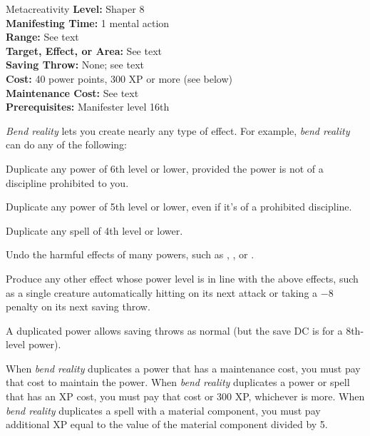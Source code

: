 {Metacreativity}
{
	\textbf{Level:}
	Shaper 8\\
	\textbf{Manifesting Time:}
	1 mental action\\
	\textbf{Range:}
	See text\\
	\textbf{Target, Effect, or Area:}
	See text\\
	\textbf{Saving Throw:}
	None; see text\\
	\textbf{Cost:}
	40 power points, 300 XP or more (see below)\\
	\textbf{Maintenance Cost:}
	See text\\
	\textbf{Prerequisites:}
	Manifester level 16th\\
}
{
	\emph{Bend reality} lets you create nearly any type of effect. For example, \emph{bend reality} can do any of the following:

	\begin{itemize*}
		\item Duplicate any power of 6th level or lower, provided the power is not of a discipline prohibited to you.
		\item Duplicate any power of 5th level or lower, even if it's of a prohibited discipline.
		\item Duplicate any spell of 4th level or lower.
		\item Undo the harmful effects of many powers, such as , , or .
		\item Produce any other effect whose power level is in line with the above effects, such as a single creature automatically hitting on its next attack or taking a $-8$ penalty on its next saving throw.
		\item A duplicated power allows saving throws as normal (but the save DC is for a 8th-level power).
	\end{itemize*}

	When \emph{bend reality} duplicates a power that has a maintenance cost, you must pay that cost to maintain the power. When \emph{bend reality} duplicates a power or spell that has an XP cost, you must pay that cost or 300 XP, whichever is more. When \emph{bend reality} duplicates a spell with a material component, you must pay additional XP equal to the value of the material component divided by 5.
}